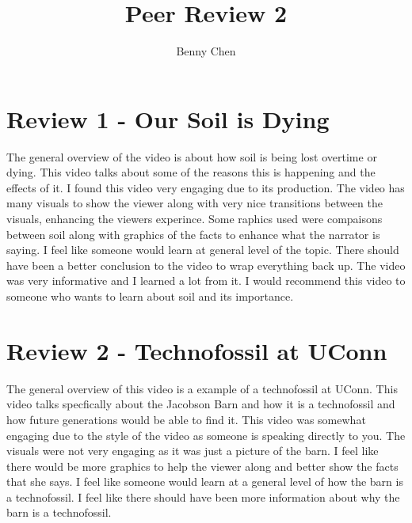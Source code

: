 \documentclass{article}
\title{Peer Review 2}
\author{Benny Chen}
\date{}
\begin{document}
\maketitle

\section*{Review 1 - Our Soil is Dying}

The general overview of the video is about how soil is being lost overtime or dying. This video talks about some of the reasons this is happening and the effects of it. I found this video very engaging due to its production. The video has many visuals to show the viewer along with very nice transitions between the visuals, enhancing the viewers experince. Some raphics used were compaisons between soil along with graphics of the facts to enhance what the narrator is saying. I feel like someone would learn at general level of the topic. There should have been a better conclusion to the video to wrap everything back up. The video was very informative and I learned a lot from it. I would recommend this video to someone who wants to learn about soil and its importance.

\section*{Review 2 - Technofossil at UConn}

The general overview of this video is a example of a technofossil at UConn. This video talks specfically about the Jacobson Barn and how it is a technofossil and how future generations would be able to find it. This video was somewhat engaging due to the style of the video as someone is speaking directly to you. The visuals were not very engaging as it was just a picture of the barn. I feel like there would be more graphics to help the viewer along and better show the facts that she says. I feel like someone would learn at a general level of how the barn is a technofossil. I feel like there should have been more information about why the barn is a technofossil. 
\end{document}
